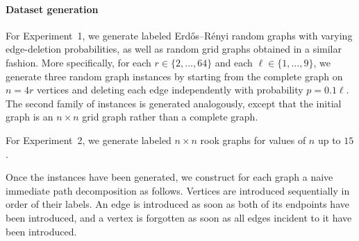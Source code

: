 \paragraph*{Dataset generation}
For Experiment~1, we generate labeled Erd\H{o}s--R\'enyi random graphs with
varying edge-deletion probabilities, as well as random grid graphs obtained in a
similar fashion. More specifically, for each $r \in \{2,\dots,64\}$ and each
$\ell \in \{1,\dots,9\}$, we generate three random graph instances by starting
from the complete graph on $n = 4r$ vertices and deleting each edge independently
with probability $p = 0.1\ell$. The second family of instances is generated
analogously, except that the initial graph is an $n \times n$ grid graph rather
than a complete graph.

For Experiment~2, we generate labeled $n \times n$ rook graphs for values of
$n$ up to $15$.

Once the instances have been generated, we construct for each graph a naive
immediate path decomposition as follows. Vertices are introduced sequentially in
order of their labels. An edge is introduced as soon as both of its endpoints
have been introduced, and a vertex is forgotten as soon as all edges incident to
it have been introduced.





